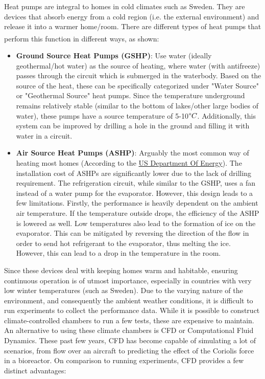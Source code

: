 \documentclass[11pt,a4paper,twoside,oneside]{article}
\begin{document}
Heat pumps are integral to homes in cold climates such as Sweden. They are  devices that absorb energy from a cold region (i.e. the external environment) and release it into a warmer home/room. There are different types of heat pumps that perform this function in different ways, as shown\textsuperscript{\cite{hundybook}}:
\begin{itemize}
    \item \textbf{Ground Source Heat Pumps (GSHP)}: Use water (ideally geothermal/hot water) as the source of heating, where water (with antifreeze) passes through the circuit which is submerged in the waterbody. Based on the source of the heat, these can be specifically categorized under "Water Source" or "Geothermal Source" heat pumps. Since the temperature underground remains relatively stable (similar to the bottom of lakes/other large bodies of water), these pumps have a source temperature of 5-10$\degree C$. Additionally, this system can be improved by drilling a hole in the ground and filling it with water in a circuit.
    \item \textbf{Air Source Heat Pumps (ASHP)}: Arguably the most common way of heating most homes (According to the \href{https://www.energy.gov/energysaver/heat-pump-systems}{US Department Of Energy})\cite{usdeptenergy}. The installation cost of ASHPs are significantly lower due to the lack of drilling requirement. The refrigeration circuit, while similar to the GSHP, uses a fan instead of a water pump for the evaporator. However, this design leads to a few limitations. Firstly, the performance is heavily dependent on the ambient air temperature. If the temperature outside drops, the efficiency of the ASHP is lowered as well. Low temperatures also lead to the formation of ice on the evaporator. This can be mitigated by reversing the direction of the flow in order to send hot refrigerant to the evaporator, thus melting the ice. However, this can lead to a drop in the temperature in the room.
\end{itemize}
Since these devices deal with keeping homes warm and habitable, ensuring continuous operation is of utmost importance, especially in countries with very low winter temperatures (such as Sweden). Due to the varying nature of the environment, and consequently the ambient weather conditions, it is difficult to run experiments to collect the performance data. While it is possible to construct climate-controlled chambers to run a few tests, these are expensive to maintain.\\
An alternative to using these climate chambers is CFD or Computational Fluid Dynamics. These past few years, CFD has become capable of simulating a lot of scenarios, from flow over an aircraft to predicting the effect of the Coriolis force in a bioreactor\cite{corioli}. On comparison to running experiments, CFD provides a few distinct advantages\cite{benecfd}\cite{cengelcimbala}:
\end{document}
